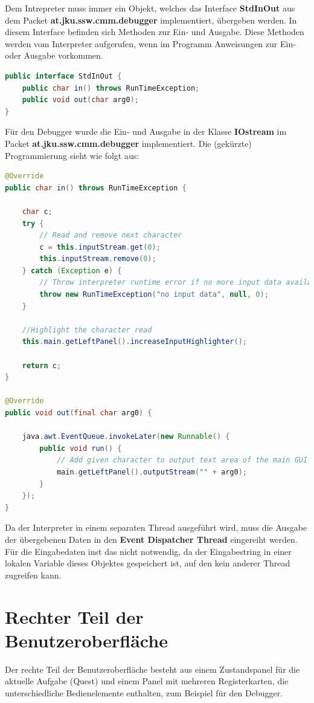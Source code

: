 Dem Intrepreter muss immer ein Objekt, welches das Interface \textbf{StdInOut} aus dem Packet \textbf{at.jku.ssw.cmm.debugger} implementiert, übergeben werden. In diesem Interface befinden sich Methoden zur Ein- und Ausgabe. Diese Methoden werden vom Interpreter aufgerufen, wenn im Programm Anweisungen zur Ein- oder Ausgabe vorkommen.

\begin{lstlisting}[language=JAVA]
public interface StdInOut {
	public char in() throws RunTimeException;
	public void out(char arg0);
}
\end{lstlisting}

Für den Debugger wurde die Ein- und Ausgabe in der Klasse \textbf{IOstream} im Packet \textbf{at.jku.ssw.cmm.debugger} implementiert. Die (gekürzte) Programmierung sieht wie folgt aus:

\begin{lstlisting}[language=JAVA]
@Override
public char in() throws RunTimeException {

	char c;
	try {
		// Read and remove next character
		c = this.inputStream.get(0);
		this.inputStream.remove(0);
	} catch (Exception e) {
		// Throw interpreter runtime error if no more input data available
		throw new RunTimeException("no input data", null, 0);
	}
	
	//Highlight the character read
	this.main.getLeftPanel().increaseInputHighlighter();
	
	return c;
}

@Override
public void out(final char arg0) {

	java.awt.EventQueue.invokeLater(new Runnable() {
		public void run() {
			// Add given character to output text area of the main GUI
			main.getLeftPanel().outputStream("" + arg0);
		}
	});
}
\end{lstlisting}

Da der Interpreter in einem separaten Thread ausgeführt wird, muss die Ausgabe der übergebenen Daten in den \textbf{Event Dispatcher Thread} eingereiht werden. Für die Eingabedaten inst das nicht notwendig, da der Eingabestring in einer lokalen Variable dieses Objektes gespeichert ist, auf den kein anderer Thread zugreifen kann.

\section{Rechter Teil der Benutzeroberfläche}
Der rechte Teil der Benutzeroberfläche besteht aus einem Zustandspanel für die aktuelle Aufgabe (Quest) und einem Panel mit mehreren Registerkarten, die unterschiedliche Bedienelemente enthalten, zum Beispiel für den Debugger.

